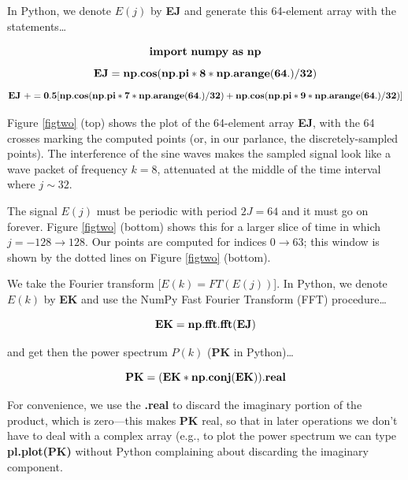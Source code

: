 \documentclass[preprint]{aastex}
\begin{document}
 In Python, we denote $E(j)$ by {\bf EJ} and generate this
64-element array with the statements\dots

\begin{mathletters} \begin{equation} \bf{ import~numpy~as~np} \end{equation}
 \begin{equation}
 \bf{ EJ = np.cos(np.pi * 8 * np.arange(64.)/32) }
\end{equation} \begin{equation} \bf{ EJ~+= 0.5[np.cos(np.pi * 7
* np.arange(64.)/32) + np.cos(np.pi * 9 * np.arange(64.)/32) ] }
\end{equation}
\end{mathletters}

\noindent Figure \ref{figtwo} (top) shows the plot of the 64-element
array {\bf EJ}, with the 64 crosses marking the computed points (or, in
our parlance, the discretely-sampled points).  The interference of the
sine waves makes the sampled signal look like a wave packet of frequency
$k=8$, attenuated at the middle of the time interval where $j \sim 32$. 

	The signal $E(j)$ must be periodic with period $2J = 64$ and it
must go on forever.  Figure \ref{figtwo} (bottom) shows this for a
larger slice of time in which $j = -128 \rightarrow 128$.  Our points
are computed for indices $0 \rightarrow 63$; this window is shown by
the dotted lines on Figure \ref{figtwo} (bottom). 

 We take the Fourier transform [$E(k) = FT( E(j))$].  In Python, we
denote $E(k)$ by {\bf EK} and use the NumPy Fast Fourier Transform (FFT)
procedure\dots

\begin{mathletters}
\begin{equation}
{\bf EK = np.fft.fft(EJ)}
\end{equation}

\noindent and get then the power spectrum $P(k)$ ({\bf PK} in Python)\dots

\begin{equation}
{\bf PK = (EK * np.conj(EK)).real}
\end{equation}
\end{mathletters}

\noindent For convenience, we use the {\bf .real} to discard the
imaginary portion of the product, which is zero---this makes {\bf PK}
real, so that in later operations we don't have to deal with a complex
array (e.g., to plot the power spectrum we can type {\bf pl.plot(PK)} without 
Python complaining about discarding the imaginary component.
\end{document}
